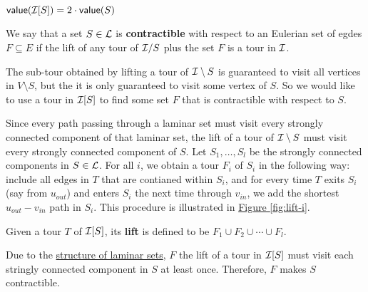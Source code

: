 \documentclass[./main.tex]{subfiles}
\begin{document}
	\begin{fact}
		$\textsf{\textup{value}}(\mathcal{I}[S]) = 2\cdot\textsf{\textup{value}}(S)$
	\end{fact}\vspace{2mm}

	\begin{definition}
		We say that a set $S \in \mathcal{L}$ is \textbf{contractible} with respect to an Eulerian set of egdes $F \subseteq E$ if the lift of any tour of $\mathcal{I}/S$ plus the set $F$ is a tour in $\mathcal{I}$.
	\end{definition}
	The sub-tour obtained by lifting a tour of $\mathcal{I}\setminus S$ is guaranteed to visit all vertices in $V\setminus S$, but the it is only guaranteed to visit some vertex of $S$. So we would like to use a tour in $\mathcal{I}[S]$ to find some set $F$ that is contractible with respect to $S$.

	Since every path passing through a laminar set must visit every strongly connected component of that laminar set, the lift of a tour of $\mathcal{I}\setminus S$ must visit every strongly connected component of $S$. Let $S_1, \dots, S_l$ be the strongly connected components in $S \in \mathcal{L}$.
	For all $i$, we obtain a tour $F_i$ of $S_i$ in the following way: include all edges in $T$ that are contianed within $S_i$, and for every time $T$ exits $S_i$ (say from $u_{out}$) and enters $S_i$ the next time through $v_{in}$, we add the shortest $u_{out} - v_{in}$ path in $S_i$.	This procedure is illustrated in \hyperref[fig:lift-i]{Figure \ref{fig:lift-i}}.
	\vspace{2mm}

	
	\begin{definition}\label{def:3:indu-lift}
		Given a tour $T$ of $\mathcal{I}[S]$, its \textbf{lift} is defined to be $F_1\cup F_2\cup\cdots\cup F_l$.
	\end{definition}




	Due to the \hyperref[fig:tightPath]{structure of laminar sets}, $F$ the lift of a tour in $\mathcal{I}[S]$ must visit each stringly connected component in $S$ at least once. Therefore, $F$ makes $S$ contractible.\\
\end{document}
